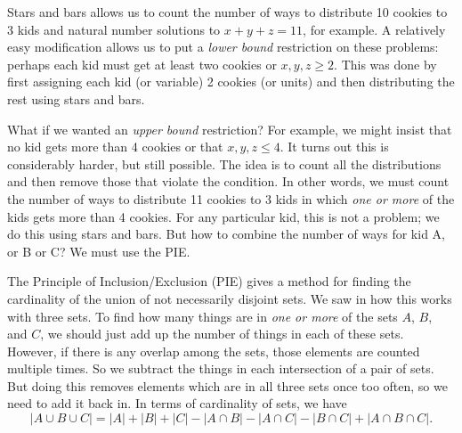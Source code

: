 \documentclass[12pt]{article}
\begin{document}
Stars and bars allows us to count the number of ways to distribute 10 cookies to 3 kids and natural number solutions to $x+y+z = 11$, for example.  A relatively easy modification allows us to put a \emph{lower bound} restriction on these problems: perhaps each kid must get at least two cookies or $x,y,z \ge 2$.  This was done by first assigning each kid (or variable) 2 cookies (or units) and then distributing the rest using stars and bars.

What if we wanted an \emph{upper bound} restriction?  For example, we might insist that no kid gets more than 4 cookies or that $x, y, z \le 4$.  It turns out this is considerably harder, but still possible.  The idea is to count all the distributions and then remove those that violate the condition.  In other words, we must count the number of ways to distribute 11 cookies to 3 kids in which \emph{one or more} of the kids gets more than 4 cookies.  For any particular kid, this is not a problem; we do this using stars and bars.  But how to combine the number of ways for kid A, or B or C?  We must use the PIE.  


The Principle of Inclusion/Exclusion (PIE) gives a method for finding the cardinality of the union of not necessarily disjoint sets.  We saw in  how this works with three sets.  To find how many things are in \emph{one or more} of the sets $A$, $B$, and $C$, we should just add up the number of things in each of these sets.  However, if there is any overlap among the sets, those elements are counted multiple times.  So we subtract the things in each intersection of a pair of sets.  But doing this removes elements which are in all three sets once too often, so we need to add it back in.  In terms of cardinality of sets, we have
\[|A \cup B \cup C| = |A| + |B| + |C| - |A \cap B| - |A \cap C| - |B \cap C| + |A\cap B \cap C|.\]
\end{document}
